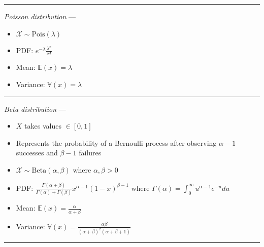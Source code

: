 {\color{lightgray}\hrule height 0.001mm}

\emph{Poisson distribution} ---
\begin{multicols}{2}
\begin{itemize}
    \item $\mathcal{X} \sim \textrm{Pois}(\lambda)$
    \item PDF: $e^{-\lambda} \frac{\lambda^x}{x!}$
    \item Mean: $\mathbb{E}(x) = \lambda$
    \item Variance: $\mathbb{V}(x) = \lambda$
\end{itemize}
\end{multicols}

{\color{lightgray}\hrule height 0.001mm}

\emph{Beta distribution} ---
\begin{itemize}
    \item $X$ takes values $\in [0,1]$
    \item Represents the probability of a Bernoulli process after observing $\alpha-1$ successes and $\beta-1$ failures
\end{itemize}
\begin{multicols}{2}
\begin{itemize}
    \item $\mathcal{X} \sim \textrm{Beta}(\alpha,\beta)$ where $\alpha,\beta > 0$
    \item PDF: $\frac{\Gamma(\alpha+\beta)}{\Gamma(\alpha)+\Gamma(\beta)} x^{\alpha-1} (1-x)^{\beta-1}$
    where $\Gamma(\alpha) = \int_0^\infty u^{\alpha-1} e^{-u} du$
    \item Mean: $\mathbb{E}(x) = \frac{\alpha}{\alpha+\beta}$
    \item Variance: $\mathbb{V}(x) = \frac{\alpha\beta}{(\alpha+\beta)^2(\alpha+\beta+1)}$
\end{itemize}
\end{multicols}

{\color{lightgray}\hrule height 0.001mm}

